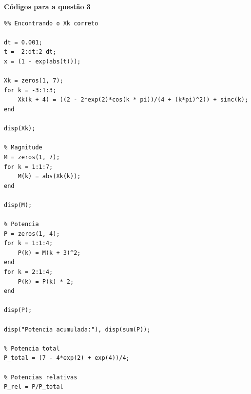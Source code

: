 \documentclass{article}
\begin{document}
{\textbf{Códigos para a questão 3}}
\begin{verbatim}
%% Encontrando o Xk correto

dt = 0.001;
t = -2:dt:2-dt;
x = (1 - exp(abs(t)));

Xk = zeros(1, 7);
for k = -3:1:3;
    Xk(k + 4) = ((2 - 2*exp(2)*cos(k * pi))/(4 + (k*pi)^2)) + sinc(k);
end

disp(Xk);

% Magnitude
M = zeros(1, 7);
for k = 1:1:7;
    M(k) = abs(Xk(k));
end

disp(M);

% Potencia
P = zeros(1, 4);
for k = 1:1:4;
    P(k) = M(k + 3)^2;
end
for k = 2:1:4;
    P(k) = P(k) * 2;
end

disp(P);

disp("Potencia acumulada:"), disp(sum(P));

% Potencia total
P_total = (7 - 4*exp(2) + exp(4))/4;

% Potencias relativas
P_rel = P/P_total
\end{verbatim}

\vspace{\baselineskip}
\end{document}
